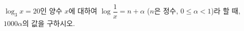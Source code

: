 $\log_3 x=20$인 양수 $x$에 대하여 $\log\dfrac{1}{x}=n+\alpha$ ($n$은 정수, $0\le\alpha<1$)라 할 때, $1000\alpha$의 값을 구하시오. 
